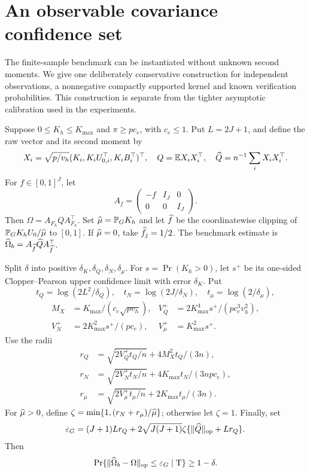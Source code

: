 \section{An observable covariance confidence set}
The finite-sample benchmark can be instantiated without unknown second moments. We give one deliberately conservative construction for independent observations, a nonnegative compactly supported kernel and known verification probabilities. This construction is separate from the tighter asymptotic calibration used in the experiments.

Suppose $0\leq K_h\leq K_{\max}$ and $\pi\geq pc_e$, with $c_e\leq1$. Put $L=2J+1$, and define the raw vector and its second moment by
\[
 X_i=\sqrt{p/v_h}(K_i,K_iU_{0,i}^\top,K_iB_i^\top)^\top,
 \quad Q=\mathbb E X_iX_i^\top,\quad \widehat Q=n^{-1}\sum_iX_iX_i^\top.
\]
For $f\in[0,1]^J$, let
\[
 A_f=\begin{pmatrix}-f&I_J&0\\0&0&I_J\end{pmatrix}.
\]
Then $\Omega=A_{F_h}QA_{F_h}^\top$. Set $\widehat\mu=\mathbb P_GK_h$ and let $\widehat f$ be the coordinatewise clipping of $\mathbb P_GK_hU_0/\widehat\mu$ to $[0,1]$. If $\widehat\mu=0$, take $\widehat f_j=1/2$. The benchmark estimate is $\widehat\Omega_b=A_{\widehat f}\widehat Q A_{\widehat f}^\top$.

Split $\delta$ into positive $\delta_K,\delta_Q,\delta_N,\delta_\mu$. For $s=\Pr(K_h>0)$, let $s^+$ be its one-sided Clopper--Pearson upper confidence limit with error $\delta_K$. Put
\[
 t_Q=\log(2L^2/\delta_Q),\quad t_N=\log(2J/\delta_N),\quad t_\mu=\log(2/\delta_\mu),
\]
\begin{align*}
 M_X&=K_{\max}/(c_e\sqrt{pv_h}),&
 V_Q^+&=2K_{\max}^4s^+/(pc_e^3v_h^2),\\
 V_N^+&=2K_{\max}^2s^+/(pc_e),&
 V_\mu^+&=K_{\max}^2s^+.
\end{align*}
Use the radii
\begin{align*}
 r_Q&=\sqrt{2V_Q^+t_Q/n}+4M_X^2t_Q/(3n),\\
 r_N&=\sqrt{2V_N^+t_N/n}+4K_{\max}t_N/(3npc_e),\\
 r_\mu&=\sqrt{2V_\mu^+t_\mu/n}+2K_{\max}t_\mu/(3n).
\end{align*}
For $\widehat\mu>0$, define $\zeta=\min\{1,(r_N+r_\mu)/\widehat\mu\}$; otherwise let $\zeta=1$. Finally, set
\begin{equation}\label{eq:ball}
 \varepsilon_G=(J+1)Lr_Q+
 2\sqrt{J(J+1)}\zeta\{\|\widehat Q\|_{\mathrm{op}}+Lr_Q\}.
\end{equation}
Then
\begin{equation}\label{eq:ballcoverage}
 \Pr\{\|\widehat\Omega_b-\Omega\|_{\mathrm{op}}\leq\varepsilon_G\mid\mathrm{T}\}\geq1-\delta.
\end{equation}

